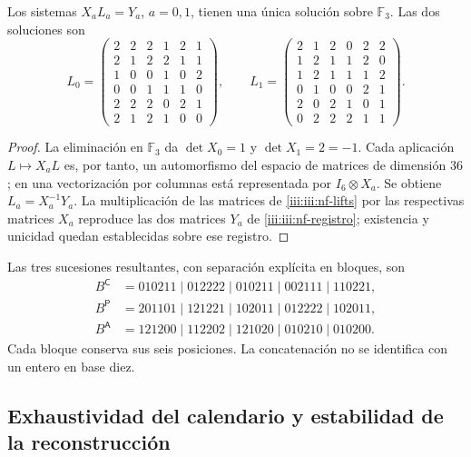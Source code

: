 \begin{proposition}
\label{iii:iii:nf-unicidad}
Los sistemas $X_aL_a=Y_a$, $a=0,1$, tienen una única solución sobre
$\mathbb F_3$. Las dos soluciones son
\begingroup\small
\begin{equation}
L_0=\begin{pmatrix}
2&2&2&1&2&1\\2&1&2&2&1&1\\1&0&0&1&0&2\\
0&0&1&1&1&0\\2&2&2&0&2&1\\2&1&2&1&0&0
\end{pmatrix},\qquad
L_1=\begin{pmatrix}
2&1&2&0&2&2\\1&2&1&1&2&0\\1&2&1&1&1&2\\
0&1&0&0&2&1\\2&0&2&1&0&1\\0&2&2&2&1&1
\end{pmatrix}.
\label{iii:iii:nf-lifts}
\end{equation}
\endgroup
\end{proposition}

\begin{proof}
La eliminación en $\mathbb F_3$ da $\det X_0=1$ y
$\det X_1=2=-1$. Cada aplicación $L\mapsto X_aL$ es, por tanto,
un automorfismo del espacio de matrices de dimensión $36$; en una
vectorización por columnas está representada por $I_6\otimes X_a$.
Se obtiene $L_a=X_a^{-1}Y_a$. La multiplicación de las matrices de
\eqref{iii:iii:nf-lifts} por las respectivas matrices $X_a$ reproduce las
dos matrices $Y_a$ de \eqref{iii:iii:nf-registro}; existencia y unicidad
quedan establecidas sobre ese registro.
\end{proof}

Las tres sucesiones resultantes, con separación explícita en bloques,
son
\begin{align*}
 B^{\mathsf C}&=010211\mid012222\mid010211\mid002111\mid110221,\\
 B^{\mathsf P}&=201101\mid121221\mid102011\mid012222\mid102011,\\
 B^{\mathsf A}&=121200\mid112202\mid121020\mid010210\mid010200.
\end{align*}
Cada bloque conserva sus seis posiciones. La concatenación no se
identifica con un entero en base diez.

\subsection{Exhaustividad del calendario y estabilidad de la reconstrucción}

